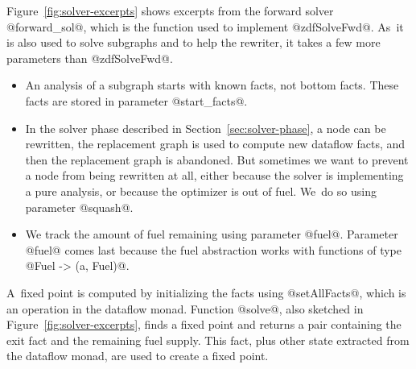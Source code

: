 \documentclass[blockstyle,preprint,nocopyrightspace]{sigplanconf}
\newcommand{\authornote}[1]{{\em #1}}
\def\authornote#1{\unskip\relax}
\newcommand{\simon}[1]{\authornote{SLPJ: #1}}
\newcommand\secref[1]{Section~\ref{sec:#1}}
\newcommand\figref[1]{Figure~\ref{fig:#1}}
\begin{document}
\figref{solver-excerpts} shows excerpts from the forward solver 
@forward_sol@, which is the function used to implement
@zdfSolveFwd@.
As~it is also used to solve subgraphs and to help the rewriter, it
takes a few more parameters than @zdfSolveFwd@.
\begin{itemize}
\item
An analysis of a subgraph starts with known facts, not bottom facts.
These facts are stored in parameter
@start_facts@.
\item
In the solver phase described in \secref{solver-phase},
a node can be rewritten, the replacement graph is used to compute new
dataflow facts, and then the replacement graph is abandoned.
But sometimes we want to prevent a node from being rewritten at all,
either because
the solver is implementing a pure analysis, or because the optimizer
is out of fuel. 
We~do so using parameter @squash@.
\item
We track the amount of fuel remaining using
parameter @fuel@.
Parameter @fuel@ comes last because the fuel abstraction works with
functions of type @Fuel -> (a, Fuel)@.
\end{itemize}
A~fixed point is computed by initializing the facts using
@setAllFacts@, which is an operation in the dataflow monad.
\simon{I think it would help to list the operations of the monad. 
E.g. How should I think of @setAllFacts@ for example? Perhaps it's a state monad, whose
state includes a mapping from @BlockId@ to fact, and @setAllFacts@ initialises this
mapping?
\textbf{NR}:
I~had written a whole section on the monad, which was interminable
and seemed peripheral to the main point.  If we had the space I would
definitely go for a figure giving the operations mentioned here. 
I'm not sure we want to use our space that way, however.  It's a conundrum.
}
Function @solve@, also sketched in \figref{solver-excerpts}, finds a
fixed point and returns a pair containing the exit fact and the
remaining fuel supply.
This fact, plus other state extracted from the dataflow monad, are
used to create a fixed point.

\simon{@solve@ transforms the @Fuel@.  But isn't @Fuel@ part of the dataflow monad?
Is @DFMonad@ in the type of @zdfRewriteFwd@ the same as @DFM@ in this
figure?
\textbf{NR}:  Sadly not.  Is @DFMonad@ in the type of @zdfRewriteFwd@
is the composition of @DFM@ with @Fuel -> (a, Fuel)@.
I~fear we are trying to cram 10~pounds of information into a 5-pound sack.
}
 
\end{document}
